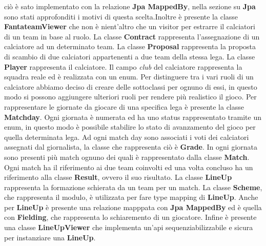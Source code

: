 ciò è sato implementato con la relazione \textbf{Jpa MappedBy}, nella sezione su \textbf{Jpa}
sono stati approfonditi i motivi di questa scelta.Inoltre è presente la classe \textbf{FantateamViewer}
che non è nient'altro che un visitor per estrarre il calciatori di un team in base al ruolo. La classe \textbf{Contract} rappresenta l'assegnazione di un
calciatore ad un determinato team. La classe \textbf{Proposal} rappresenta la proposta di scambio
di due calciatori appartenenti a due team della stessa lega. La classe \textbf{Player} rappresenta il calciatore. Il
campo \textit{club} del calciatore rappresenta la squadra reale ed è realizzata con un enum.
Per distinguere tra i vari ruoli di un calciatore abbiamo deciso di creare delle sottoclassi per ognuno di essi,
in questo modo si possono aggiungere ulteriori ruoli per rendere più realistico il gioco.
Per rappresentare le giornate da giocare di una specifica lega è presente la classe \textbf{Matchday}. Ogni giornata è numerata
ed ha uno status rappresentato tramite un enum, in questo modo è possibile stabilire lo stato di avanzamento del gioco
per quella determinata lega. Ad ogni match day sono associati i voti dei calciatori
assegnati dal giornalista, la classe che rappresenta ciò è \textbf{Grade}.
In ogni giornata sono presenti più match ognuno dei quali è rappresentato 
dalla classe \textbf{Match}. Ogni match ha il riferimento ai due team coinvolti
ed una volta concluso ha un riferimento alla classe \textbf{Result}, ovvero il suo risultato.
La classe \textbf{LineUp} rappresenta la formazione schierata da un team per un match.
La classe \textbf{Scheme}, che rappresenta il modulo, è utilizzata per fare type mapping di \textbf{LineUp}. Anche per \textbf{LineUp} è presente una relazione mapppata
con \textbf{Jpa MappedBy} ed è quella con \textbf{Fielding}, che rappresenta lo schiaremento di un giocatore.
Infine è presente una classe \textbf{LineUpViewer} che implementa un'api sequenziabilizzabile e sicura
per instanziare una \textbf{LineUp}.

